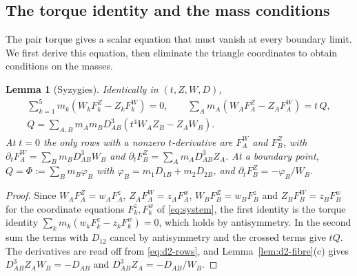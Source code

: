 \documentclass[Threeside,11pt]{article}
\newtheorem{lemma}[theorem]{Lemma}
\theoremstyle{definition}
\theoremstyle{remark}
\numberwithin{equation}{section}
\theoremstyle{remark}
\begin{document}
\subsection{\texorpdfstring{The torque identity and the mass conditions}{The torque identity and the mass conditions}}\label{sec:d2-first}

The pair torque gives a scalar equation that must vanish at every boundary limit.
We first derive this equation, then eliminate the triangle coordinates to obtain
conditions on the masses.

\begin{lemma}[Syzygies]\label{lem:d2-syzygy}
Identically in $(t,Z,W,D)$,
\begin{gather*}
  \textstyle\sum_{k=1}^5m_k(W_kF^Z_k-Z_kF^W_k)=0,\qquad
  \sum_Am_A(W_AF^Z_A-Z_AF^W_A)=t\,Q,\\
  Q=\textstyle\sum_{A,B}m_Am_BD_{AB}^3(t^4W_AZ_B-Z_AW_B).
\end{gather*}
At $t=0$ the only rows with a nonzero $t$-derivative are $F^W_A$ and $F^Z_B$, with
$\partial_tF^W_A=\sum_Bm_BD_{AB}^3W_B$ and $\partial_tF^Z_B=\sum_Am_AD_{AB}^3Z_A$.  At a boundary point,
$Q=\Phi:=\sum_Bm_B\varphi_B$ with $\varphi_B=m_1D_{1B}+m_2D_{2B}$, and
$\partial_tF^Z_B=-\varphi_B/W_B$.
\end{lemma}

\begin{proof}
Since $W_AF^Z_A=w_AF^z_A$, $Z_AF^W_A=z_AF^w_A$, $W_BF^Z_B=w_BF^z_B$ and $Z_BF^W_B=z_BF^w_B$ for
the coordinate equations $F^z_k,F^w_k$ of \eqref{eq:system}, the first identity is the torque
identity $\sum_km_k(w_kF^z_k-z_kF^w_k)=0$, which holds by antisymmetry.  In the second sum the
terms with $D_{12}$ cancel by antisymmetry and the crossed terms give $tQ$.  The derivatives are
read off from \eqref{eq:d2-rows}, and Lemma~\ref{lem:d2-fibre}(c) gives
$D_{AB}^3Z_AW_B=-D_{AB}$ and $D_{AB}^3Z_A=-D_{AB}/W_B$.
\end{proof}
\end{document}
